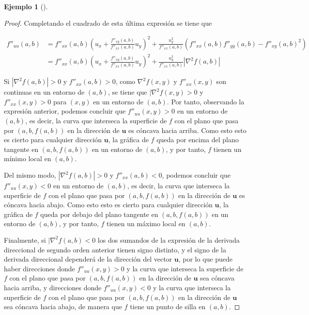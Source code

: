 \documentclass[
  a4paper,
]{scrreport}
\theoremstyle{definition}
\newtheorem{example}{Ejemplo}[chapter]
\theoremstyle{plain}
\theoremstyle{definition}
\theoremstyle{definition}
\theoremstyle{plain}
\theoremstyle{plain}
\theoremstyle{remark}
\begin{document}
\begin{example}[]
\begin{tcolorbox}
\begin{proof}
Completando el cuadrado de esta última expresión se tiene que

\begin{align*}
f''_{uu}(a,b) 
&= f''_{xx}(a,b)\left(u_x+\frac{f''_{xy}(a,b)}{f''_{xx}(a,b)}u_y\right)^2+\frac{u_y^2}{f''_{xx}(a,b)}(f''_{xx}(a,b)f''_{yy}(a,b)-f''_{xy}(a,b)^2) \\
&= f''_{xx}(a,b)\left(u_x+\frac{f''_{xy}(a,b)}{f''_{xx}(a,b)}u_y\right)^2+\frac{u_y^2}{f''_{xx}(a,b)}|\nabla^2 f(a,b)|
\end{align*}

Si \(|\nabla ^2f(a,b)|>0\) y \(f''_{xx}(a,b)>0\), como
\(\nabla ^2f(x,y)\) y \(f''_{xx}(x,y)\) son continuas en un entorno de
\((a,b)\), se tiene que \(|\nabla ^2f(x,y)>0\) y \(f''_{xx}(x,y)>0\)
para \((x,y)\) en un entorno de \((a,b)\). Por tanto, observando la
expresión anterior, podemos concluir que \(f''_{uu}(x,y)>0\) en un
entorno de \((a,b)\), es decir, la curva que interseca la superficie de
\(f\) con el plano que pasa por \((a,b,f(a,b))\) en la dirección de
\(\mathbf{u}\) es cóncava hacia arriba. Como esto esto es cierto para
cualquier dirección \(\mathbf{u}\), la gráfica de \(f\) queda por encima
del plano tangente en \((a,b,f(a,b))\) en un entorno de \((a,b)\), y por
tanto, \(f\) tienen un mínimo local en \((a,b)\).

Del mismo modo, \(|\nabla ^2f(a,b)|>0\) y \(f''_{xx}(a,b)<0\), podemos
concluir que \(f''_{uu}(x,y)<0\) en un entorno de \((a,b)\), es decir,
la curva que interseca la superficie de \(f\) con el plano que pasa por
\((a,b,f(a,b))\) en la dirección de \(\mathbf{u}\) es cóncava hacia
abajo. Como esto esto es cierto para cualquier dirección \(\mathbf{u}\),
la gráfica de \(f\) queda por debajo del plano tangente en
\((a,b,f(a,b))\) en un entorno de \((a,b)\), y por tanto, \(f\) tienen
un máximo local en \((a,b)\).

Finalmente, si \(|\nabla ^2f(a,b)<0\) los dos sumandos de la expresión
de la derivada direccional de segundo orden anterior tienen signo
distinto, y el signo de la derivada direccional dependerá de la
dirección del vector \(\mathbf{u}\), por lo que puede haber direcciones
donde \(f''_{uu}(x,y)>0\) y la curva que interseca la superficie de
\(f\) con el plano que pasa por \((a,b,f(a,b))\) en la dirección de
\(\mathbf{u}\) sea cóncava hacia arriba, y direcciones donde
\(f''_{uu}(x,y)<0\) y la curva que interseca la superficie de \(f\) con
el plano que pasa por \((a,b,f(a,b))\) en la dirección de \(\mathbf{u}\)
sea cóncava hacia abajo, de manera que \(f\) tiene un punto de silla en
\((a,b)\).
\end{proof}


\end{tcolorbox}
\end{example}
\end{document}
